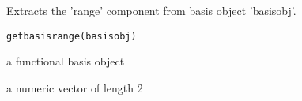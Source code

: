 \begin{Description}\relax
Extracts the 'range' component from basis object 'basisobj'.
\end{Description}
\begin{Usage}
\begin{verbatim}
getbasisrange(basisobj) 
\end{verbatim}
\end{Usage}
\begin{Arguments}
\begin{ldescription}
\item[\code{basisobj}] a functional basis object 

\end{ldescription}
\end{Arguments}
\begin{Value}
a numeric vector of length 2
\end{Value}


